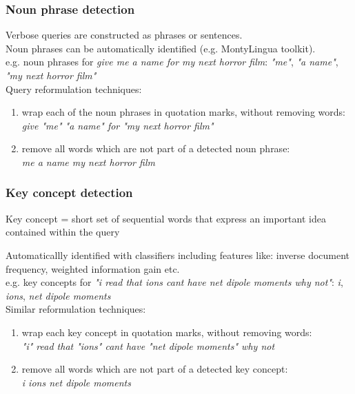 \begin{frame}
\frametitle{Noun phrase detection}
Verbose queries are constructed as phrases or sentences.\\
\vskip10pt
Noun phrases can be automatically identified (e.g. MontyLingua toolkit).\\
e.g. noun phrases for \textit{give me a name for my next horror film}: \textit{"me"}, \textit{"a name"}, \textit{"my next horror film"}\\
\vskip10pt
Query reformulation techniques:\\
\begin{enumerate}
\item
wrap each of the noun phrases in quotation marks, without removing words:\\
\textit{give "me" "a name" for "my next horror film"}
\item
remove all words which are not part of a detected noun phrase:\\
\textit{me a name my next horror film}
\end{enumerate}
\end{frame}

\begin{frame}
\frametitle{Key concept detection}
\begin{block}
{Key concept = short set of sequential words that express an important idea contained within the query}
\end{block}
Automaticallly identified with classifiers including features like: inverse document frequency, weighted information gain etc.\\
e.g. key concepts for \textit{"i read that ions cant have net dipole moments why not"}: \textit{i}, \textit{ions}, \textit{net dipole moments}\\
\vskip10pt 
Similar reformulation techniques:\\
\begin{enumerate}
\item
wrap each key concept in quotation marks, without removing words:\\
\textit{"i" read that "ions" cant have "net dipole moments" why not}
\item
remove all words which are not part of a detected key concept:\\
\textit{i ions net dipole moments}
\end{enumerate}

\end{frame}

